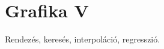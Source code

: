 \documentclass[../../main.tex]{subfiles}
\begin{document}
\section{Grafika V}

\begin{fulltheorem}
	Rendezés, keresés, interpoláció, regresszió.
\end{fulltheorem}
\end{document}
